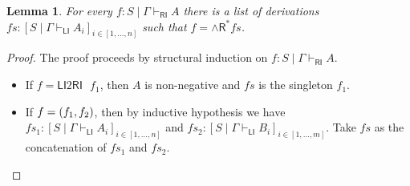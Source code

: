 \documentclass[submission,copyright,creativecommons]{eptcs}
\newtheorem{lemma}[theorem]{Lemma}
\theoremstyle{definition}
\newcommand{\andr}{\land \mathsf{R}}
\newcommand{\RI}{\mathsf{RI}}
\newcommand{\LI}{\mathsf{LI}}
\newcommand\niccolo[1]{\mbox{}
{\marginpar{\color{red}NV}}
{\sf\noindent\color{red}#1}}%
\begin{document}
\begin{lemma}\label{lem:RI:invert}
  For every $f : S \mid \Gamma \vdash_{\RI} A$ there is a list of derivations $fs : [S \mid \Gamma \vdash_{\LI} A_i]_{i \in [1 , \dots , n]}$ such that $f = \andr^{*} fs$.
\end{lemma}
\begin{proof}
  The proof proceeds by structural induction on $f : S \mid \Gamma \vdash_{\RI} A$.
  \begin{itemize}
    \item If $f = \LI2 \RI \text{ } f_1$, then $A$ is non-negative and $fs$ is the singleton $f_1$.
    \item If $f = \relax(f_1, f_2)$, then by inductive hypothesis we have $fs_1 : [S \mid \Gamma \vdash_{\LI} A_i]_{i \in [1 , \dots , n]}$ and $fs_2 : [S \mid \Gamma \vdash_{\LI} B_i]_{i \in [1 , \dots , m]}$. Take $fs$ as the concatenation of $fs_1$ and $fs_2$.
  \end{itemize}
\end{proof}
\end{document}
